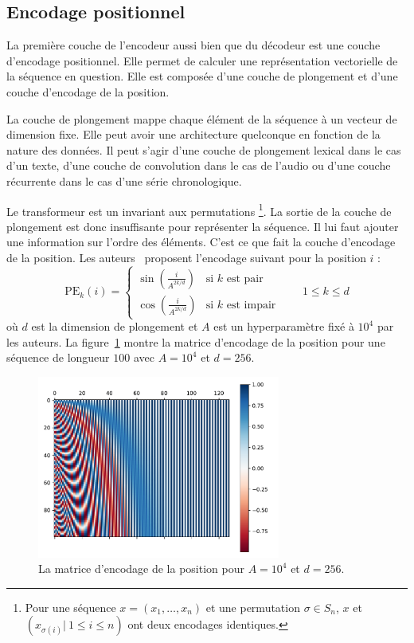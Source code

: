 \subsection{Encodage positionnel}

La première couche de l'encodeur aussi bien que du décodeur est une couche d'encodage positionnel.
Elle permet de calculer une représentation vectorielle de la séquence en question.
Elle est composée d'une couche de plongement et d'une couche d'encodage de la position.

La couche de plongement mappe chaque élément de la séquence à un vecteur de dimension fixe.
Elle peut avoir une architecture quelconque en fonction de la nature des données.
Il peut s'agir d'une couche de plongement lexical dans le cas d'un texte, 
d'une couche de convolution dans le cas de l'audio 
ou d'une couche récurrente dans le cas d'une série chronologique.

Le transformeur est un invariant aux permutations%
\footnote{%
    Pour une séquence \(x = (x_1, \ldots, x_n)\) et une permutation \(\sigma\in S_n\),
    \(x\) et \(\left(x_{\sigma(i)}|\ 1 \le i \le n\right)\) ont deux encodages identiques.
}.
La sortie de la couche de plongement est donc insuffisante pour représenter la séquence.
Il lui faut ajouter une information sur l'ordre des éléments.
C'est ce que fait la couche d'encodage de la position.
Les auteurs~\cite{attention} proposent l'encodage suivant pour la position \(i\) :
\begin{equation}
    \label{eq.sine-positional-encoding}
    \mathrm{PE}_{k}(i) = 
    \begin{cases}
        \sin\left(\frac{i}{A^{2k/d}}\right) & \text{si } k \text{ est pair} \\
        \cos\left(\frac{i}{A^{2k/d}}\right) & \text{si } k \text{ est impair}
    \end{cases} \qquad 1 \le k \le d
\end{equation}
où \(d\) est la dimension de plongement et \(A\) est un hyperparamètre fixé à \(10^4\) par les auteurs.
La figure~\ref{fig.positional-encoding} montre la matrice d'encodage de la position 
pour une séquence de longueur \(100\) avec \(A=10^4\) et \(d=256\).

\begin{figure}[htb]
    \centering
    \includegraphics[width=8cm]{assets/python/positional_embedding.pdf}
    \caption{La matrice d'encodage de la position pour \(A=10^4\) et \(d=256\).}
    \label{fig.positional-encoding}
    
\end{figure}

